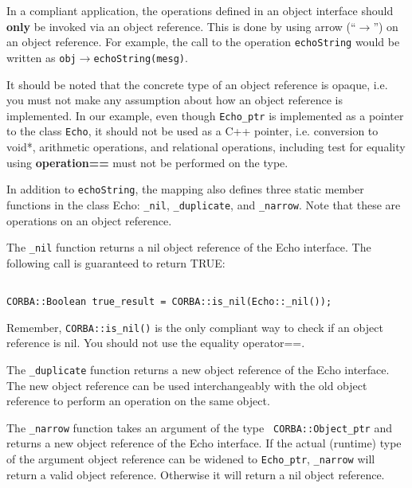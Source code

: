 \documentclass[11pt,twoside,onecolumn]{book}
\begin{document}
In a compliant application, the operations defined in an object interface
should {\bf only} be invoked via an object reference. This is done by using
arrow (``$\rightarrow$'') on an object reference. For example, the call to the
operation {\tt echoString} would be written as {\tt obj$\rightarrow$echoString(mesg)}. 

It should be noted that the concrete type of an object reference is opaque,
i.e. you must not make any assumption about how an object reference is
implemented. In our example, even though {\tt Echo\_ptr} is implemented as
a pointer to the class {\tt Echo}, it should not be used as a C++ pointer,
i.e. conversion to void*, arithmetic operations, and relational operations,
including test for equality using {\bf operation==} must not be performed
on the type.

In addition to {\tt echoString}, the mapping also defines three static
member functions in the class Echo: {\tt \_nil}, {\tt \_duplicate}, and 
{\tt \_narrow}. Note that these are operations on an object reference. 

The {\tt \_nil} function returns a nil object reference of the Echo interface. The
following call is guaranteed to return TRUE:

{\small
\begin{verbatim}

CORBA::Boolean true_result = CORBA::is_nil(Echo::_nil());

\end{verbatim}
}

Remember, {\tt CORBA::is\_nil()} is the only compliant way to check if an
object reference is nil. You should not use the equality operator==.

The {\tt \_duplicate} function returns a new object reference of the Echo
interface. The new object reference can be used interchangeably with the old
object reference to perform an operation on the same object.



The {\tt \_narrow} function takes an argument of the type {\tt
CORBA::Object\_ptr} and returns a new object reference of the Echo
interface.  If the actual (runtime) type of the argument object reference
can be widened to {\tt Echo\_ptr}, {\tt \_narrow} will return a valid object
reference. Otherwise it will return a nil object reference.
\end{document}
